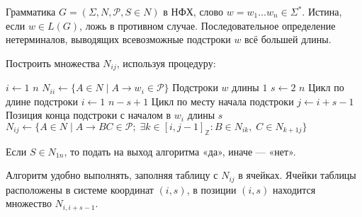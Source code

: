 {\label{cyk}Грамматика $G=(\Sigma, N, \mathcal P, S \in N)$ в НФХ,
слово $w = w_1 \ldots w_n \in \Sigma^*$.}
{Истина, если $w \in L(G)$, ложь  в противном случае.}
{Последовательное определение нетерминалов, выводящих
всевозможные подстроки $w$ всё большей длины.}
{
\item Построить множества $N_{ij}$, используя процедуру:
\begin{codebox}
\zi\For $i \gets 1$  $n$
\zi     \Do
        $N_{ii} \gets \{ A \in N \mid A \to w_i \in \mathcal P  \}$
        \Comment Подстроки $w$ длины $1$
        \End
\zi\For $s \gets 2$  $n$ \Comment Цикл по длине подстроки
\zi     \Do
        \For $i \gets 1$  $n - s + 1$ \Comment Цикл по месту начала подстроки
\zi         $j \gets i + s - 1$
            \Comment Позиция конца подстроки с началом в $w_i$ длины $s$
\zi         $N_{ij} \gets \{ A \in N \mid A \to BC \in \mathcal P; \;
                \exists k \in [i, j-1]_{\mathbb Z} \colon B \in N_{ik}, \;
                C \in N_{k+1 j} \} $
        \End
\end{codebox}

\item
Если $S \in N_{1n}$, то подать на выход алгоритма «да», иначе — «нет».
}

\begin{myremark}
Алгоритм удобно выполнять, заполняя таблицу с $N_{ij}$ в ячейках. Ячейки таблицы
расположены в системе координат $(i,s)$, в позиции $(i,s)$ находится множество
$N_{i, i+s-1}$.
\end{myremark}
